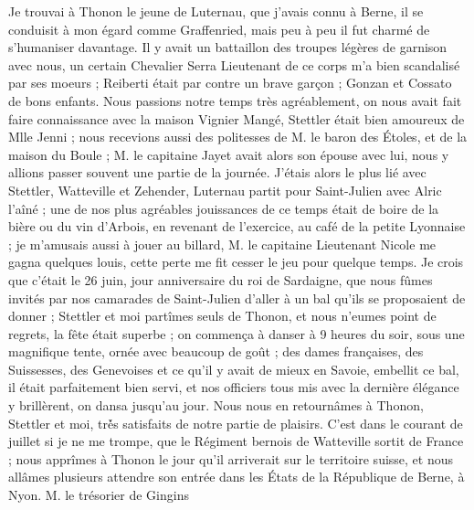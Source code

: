 \documentclass[12pt]{article}
\begin{document}
 Je trouvai à Thonon le jeune de Luternau, que j’avais
connu à Berne, il se conduisit à mon égard comme Graffenried, mais peu à peu il fut charmé de
s’humaniser davantage. Il y avait un battaillon des troupes légères de garnison avec nous, un
certain Chevalier Serra Lieutenant de ce corps m’a bien scandalisé par ses moeurs ; Reiberti était
par contre un brave garçon ; Gonzan et Cossato de bons enfants. Nous passions notre temps très
agréablement, on nous avait fait faire connaissance avec la maison Vignier Mangé, Stettler était
bien amoureux de Mlle Jenni ; nous recevions aussi des politesses de M. le baron des Étoles, et de
la maison du Boule ; M. le capitaine Jayet avait alors son épouse avec lui, nous y allions passer
souvent une partie de la journée. J’étais alors le plus lié avec Stettler, Watteville et Zehender,
Luternau partit pour Saint-Julien avec Alric l’aîné ; une de nos plus agréables jouissances de ce
temps était de boire de la bière ou du vin d’Arbois, en revenant de l’exercice, au café de la petite
Lyonnaise ; je m’amusais aussi à jouer au billard, M. le capitaine Lieutenant Nicole me gagna
quelques louis, cette perte me fit cesser le jeu pour quelque temps. Je crois que c’était le 26
juin, jour anniversaire du roi de Sardaigne, que nous fûmes invités par nos camarades de
Saint-Julien d’aller à un bal qu’ils se proposaient de donner ; Stettler et moi partîmes seuls de
Thonon, et nous n’eumes point de regrets, la fête était superbe ; on commença à danser à 9 heures du
soir, sous une magnifique tente, ornée avec beaucoup de goût ; des dames françaises, des Suissesses,
des Genevoises et ce qu’il y avait de mieux en Savoie, embellit ce bal, il était parfaitement bien
servi, et nos officiers tous mis avec la dernière élégance y brillèrent, on dansa jusqu’au jour.
Nous nous en retournâmes à Thonon, Stettler et moi, trè́s satisfaits de notre partie de plaisirs.
C’est dans le courant de juillet si je ne me trompe, que le Régiment bernois de Watteville sortit de
France ; nous apprîmes à Thonon le jour qu’il arriverait sur le territoire suisse, et nous allâmes
plusieurs attendre son entrée dans les États de la République de Berne, à Nyon. M. le trésorier de
Gingins
\end{document}
